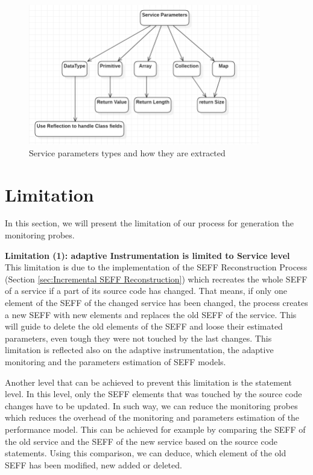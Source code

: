 \begin{figure}[h]
\centering
\includegraphics[width=0.9\textwidth]{figures/service_parameters}
\caption{Service parameters types and how they are extracted}
\label{fig:service_parameters}
\end{figure}


\section{Limitation}
\label{sec:Limitation}
In this section, we will present the limitation of our process for generation the monitoring probes. 

\textbf{Limitation (1): adaptive Instrumentation is limited to Service level}
This limitation is due to the implementation of the SEFF Reconstruction Process (Section \ref{sec:Incremental SEFF Reconstruction}) which recreates the whole SEFF of a service if a part of its source code has changed. That means, if only one element of the SEFF of the changed service has been changed, the process creates a new SEFF with new elements and replaces the old SEFF of the service. This will guide to delete the old elements of the SEFF and loose their estimated parameters, even tough they were not touched by the last changes. This limitation is reflected also on the adaptive instrumentation, the adaptive monitoring and the parameters estimation of SEFF models. 

Another level that can be achieved to prevent this limitation is the statement level. In this level, only the SEFF elements that was touched by the source code changes have to be updated. In such way, we can reduce the monitoring probes which reduces the overhead of the monitoring and parameters estimation of the performance model. This can be achieved for example by comparing the SEFF of the old service and the SEFF of the new service based on the source code statements. Using this comparison, we can deduce, which element of the old SEFF has been modified, new added or deleted.  

